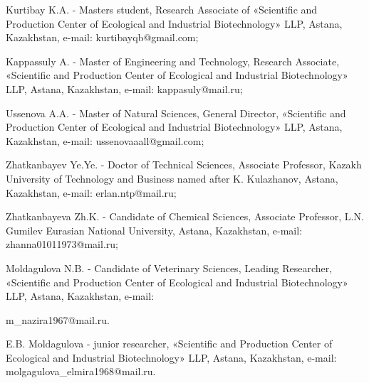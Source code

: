 \begin{noparindent}
Kurtibay K.A. - Master\textquotesingle s student, Research Associate of
«Scientific and Production Center of Ecological and Industrial
Biotechnology» LLP, Astana, Kazakhstan, e-mail: kurtibayqb@gmail.com;

Kappassuly A. - Master of Engineering and Technology, Research
Associate, «Scientific and Production Center of Ecological and
Industrial Biotechnology» LLP, Astana, Kazakhstan, e-mail:
kappasuly@mail.ru;

Ussenova A.A. - Master of Natural Sciences, General Director,
«Scientific and Production Center of Ecological and Industrial
Biotechnology» LLP, Astana, Kazakhstan, e-mail: ussenovaaall@gmail.com;

Zhatkanbayev Ye.Ye. - Doctor of Technical Sciences, Associate Professor,
Kazakh University of Technology and Business named after K. Kulazhanov,
Astana, Kazakhstan, e-mail: erlan.ntp@mail.ru;

Zhatkanbayeva Zh.K. - Candidate of Chemical Sciences, Associate
Professor, L.N. Gumilev Eurasian National University, Astana,
Kazakhstan, e-mail: zhanna01011973@mail.ru;

Moldagulova N.B. - Candidate of Veterinary Sciences, Leading Researcher,
«Scientific and Production Center of Ecological and Industrial
Biotechnology» LLP, Astana, Kazakhstan, e-mail:

m\_nazira1967@mail.ru.

E.B. Moldagulova - junior researcher, «Scientific and Production Center
of Ecological and Industrial Biotechnology» LLP, Astana, Kazakhstan,
e-mail: molgagulova\_elmira1968@mail.ru.
\end{noparindent}
